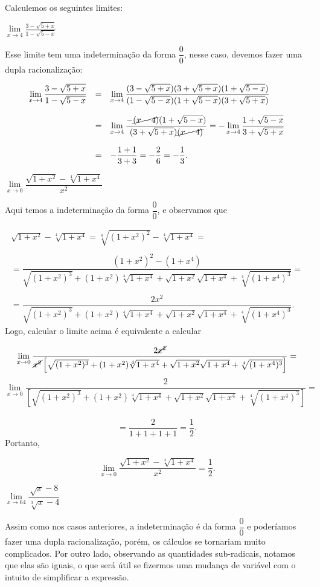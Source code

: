 \cleardoublepage\documentclass[../main.tex]{subfiles}
\begin{document}
\begin{exeresol}
  Calculemos os seguintes limites:
\begin{compactenum}[a)]
\item \( \lim\limits_{x \to 4} \frac{3-\sqrt{5+x}}{1-\sqrt{5-x}}\)
\begin{resol}
Esse limite tem uma indeterminação da forma \(\dfrac{0}{0}\), nesse caso, devemos fazer uma dupla racionalização:

\[ \begin{array}{rcl} \lim\limits_{x \to 4} \dfrac{3-\sqrt{5+x}}{1-\sqrt{5-x}}& = & \lim\limits_{x \to 4} \dfrac{(3-\sqrt{5+x})(3+\sqrt{5+x}) (1+\sqrt{5-x})}{(1-\sqrt{5-x})(1+\sqrt{5-x})(3+\sqrt{5+x})}\\ \\ & =& \lim\limits_{x \to 4}\dfrac{-\cancel{(x-4)}(1+\sqrt{5-x})}{(3+\sqrt{5+x})\cancel{(x-4)}}= -\lim\limits_{x \to 4}\dfrac{1+\sqrt{5-x}}{3+\sqrt{5+x}} \\ \\ &=& -\dfrac{1+1}{3+3}=-\dfrac{2}{6}= -\dfrac{1}{3}. \end{array} \]
\end{resol}
\item \( \lim\limits_{x \to 0} \dfrac{\sqrt{1+x^2}-\sqrt[4]{1+x^4}}{x^2}\)
\begin{resol}
Aqui temos a indeterminação da forma \(\dfrac{0}{0}\), e observamos que

\[ \begin{array}{l} \sqrt{1+x^2}-\sqrt[4]{1+x^4}=\sqrt[4]{(1+x^2)^2}-\sqrt[4]{1+x^4}=\\ \\ = \dfrac{(1+x^2)^2 -(1+x^4)}{\sqrt{(1+x^2)^3} +(1+x^2)\sqrt[4]{1+x^4} + \sqrt{1+x^2}\sqrt{1+x^4} + \sqrt[4]{(1+x^4)^3}}=\\ \\ = \dfrac{2x^2}{\sqrt{(1+x^2)^3} +(1+x^2)\sqrt[4]{1+x^4} + \sqrt{1+x^2}\sqrt{1+x^4} + \sqrt[4]{(1+x^4)^3}}. \end{array} \]
Logo, calcular o limite acima é equivalente a calcular

\[ \lim\limits_{x\to 0}\dfrac{2\cancel{x^2}}{\cancel{x^2}\left[\sqrt{(1+x^2)^3} +(1+x^2)\sqrt[4]{1+x^4} + \sqrt{1+x^2}\sqrt{1+x^4} + \sqrt[4]{(1+x^4)^3}\right]} = \] \[ \lim\limits_{x\to 0}\dfrac{2}{\left[\sqrt{(1+x^2)^3} +(1+x^2)\sqrt[4]{1+x^4} + \sqrt{1+x^2}\sqrt{1+x^4} + \sqrt[4]{(1+x^4)^3}\right]}=\]\\
\[= \dfrac{2}{1+1+1+1}=\dfrac{1}{2}. \]
Portanto,

\[ \lim\limits_{x \to 0} \dfrac{\sqrt{1+x^2}-\sqrt[4]{1+x^4}}{x^2} =\dfrac{1}{2}. \]
\end{resol}
\item \( \lim\limits_{x \to 64} \dfrac{\sqrt{x}-8}{\sqrt[3]{x}-4}\)\\
\begin{resol}
Assim como nos casos anteriores, a indeterminação é da forma \(\dfrac{0}{0}\) e poderíamos fazer uma dupla racionalização, porém, os cálculos se tornariam muito complicados. Por outro lado, observando as quantidades sub-radicais, notamos que elas são iguais, o que será útil se fizermos uma mudança de variável com o intuito de simplificar a expressão.


\end{resol}
\end{compactenum}
\end{exeresol}
\end{document}
